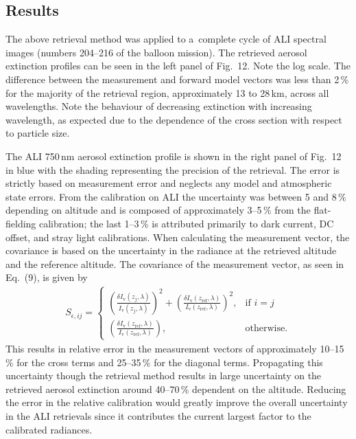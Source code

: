 \documentclass[amt]{copernicus}
\begin{document}
\subsection{Results}

The above retrieval method was applied to a~complete cycle of ALI
spectral images (numbers 204--216 of the balloon mission). The
retrieved aerosol extinction profiles can be seen in the left panel of
Fig.~12. Note the log scale. The difference
between the measurement and forward model vectors was less than
2\,{\%} for the majority of the retrieval region, approximately 13 to
28\,\unit{km}, across all wavelengths. Note the behaviour of decreasing
extinction with increasing wavelength, as expected due to the
dependence of the cross section with respect to particle size.



The ALI 750\,\unit{nm} aerosol extinction profile is shown in the
right panel of Fig.~12 in blue with the shading representing the
precision of the retrieval. The error is strictly based on measurement
error and neglects any model and atmospheric state errors. From the calibration on ALI the uncertainty was between 5 and 8\,{\%}
depending
on altitude and is composed of approximately 3--5\,{\%} from the flat-fielding calibration; the last 1--3\,{\%} is attributed
primarily to dark current, DC offset, and stray light calibrations. When calculating the measurement vector,
the covariance is based on the uncertainty in the radiance at the retrieved altitude and the reference altitude.
The covariance of the measurement vector, as seen in Eq.~(9), is given by
\begin{align}
S_{\epsilon,ij}=
\begin{cases}
    \left(\frac{\delta I_\text{v}(z_{j},\lambda)}{I_\text{v}(z_{j},\lambda)}\right)^{2} + \left(\frac{\delta I_\text{v}(z_\text{ref},\lambda)}{I_\text{v}(z_\text{ref},\lambda)}\right)^{2}, & \text{if } i=j\\
    \left(\frac{\delta I_\text{v}(z_\text{ref},\lambda)}{I_\text{v}(z_\text{ref},\lambda)}\right), & \text{otherwise}.
\end{cases}
\end{align}
This results in relative error in the measurement vectors of approximately 10--15\,{\%} for the cross terms and 25--35\,{\%}
for the diagonal terms. Propagating this uncertainty though the retrieval method results in large uncertainty on the
retrieved aerosol extinction around 40--70\,{\%} dependent on the altitude. Reducing the error in the relative
calibration would greatly improve the overall uncertainty in the ALI retrievals since it contributes the current largest factor to the calibrated radiances.
\end{document}
